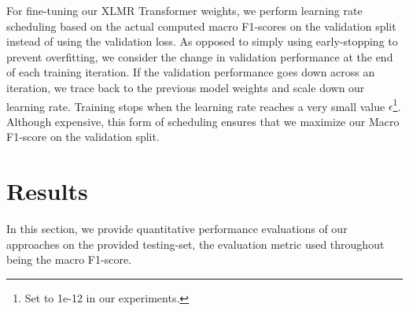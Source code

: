 \documentclass[
]{ceurart}
\begin{document}

For fine-tuning our XLMR Transformer weights, we perform learning rate scheduling based on the actual computed macro F1-scores on the validation split instead of using the validation loss. As opposed to simply using early-stopping to prevent overfitting, we consider the change in validation performance at the end of each training iteration. If the validation performance goes down across an iteration, we trace back to the previous model weights and scale down our learning rate. Training stops when the learning rate reaches a very small value $\epsilon$\footnote{Set to 1e-12 in our experiments.}. Although expensive, this form of scheduling ensures that we maximize our Macro F1-score on the validation split.

\section{Results}
\label{sec:results}
In this section, we provide quantitative performance evaluations of our approaches on the provided testing-set, the evaluation metric used throughout being the macro F1-score. 


\end{document}
